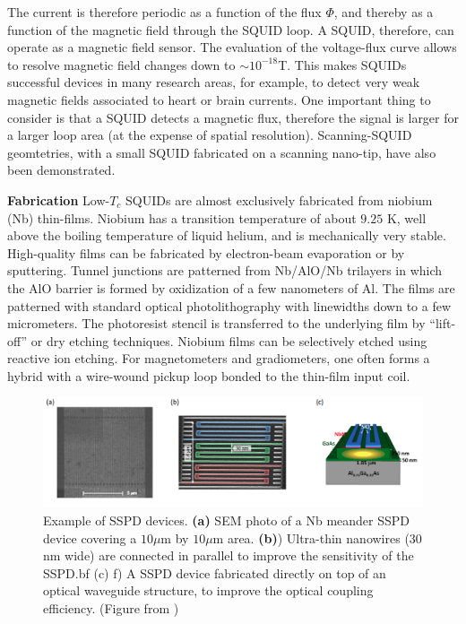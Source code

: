 \documentclass[a4paper,11pt]{article}
\begin{document}
The current is therefore periodic as a function of the flux $\Phi$, and thereby as a function of the magnetic field through the SQUID loop. A SQUID, therefore, can operate as a magnetic field sensor. The evaluation of the voltage-flux curve allows to resolve magnetic field changes down to $\sim 10^{-18}$T. This makes SQUIDs successful devices in many research areas, for example, to detect very weak magnetic fields associated to heart or brain currents. One important thing to consider is that a SQUID detects a magnetic flux, therefore the signal is larger for a larger loop area (at the expense of spatial resolution). Scanning-SQUID geomtetries, with a small SQUID fabricated on a scanning nano-tip, have also been demonstrated.

{\bf Fabrication} Low-$T_c$ SQUIDs are almost exclusively fabricated from niobium (Nb) thin-films. Niobium has a transition temperature of about $9.25$ K, well above the boiling temperature of liquid helium, and is mechanically very stable. High-quality films can  be  fabricated  by  electron-beam  evaporation  or  by  sputtering.  Tunnel  junctions are  patterned  from Nb/AlO/Nb trilayers in which the AlO barrier is formed by oxidization of a few nanometers of Al. The films are patterned with standard optical photolithography with linewidths down to a few micrometers. The photoresist stencil is transferred to the underlying film by “lift-off” or dry etching techniques. Niobium films can be selectively etched using reactive ion etching. For magnetometers and gradiometers, one often forms a hybrid with a wire-wound pickup loop bonded to the thin-film input coil.

\begin{figure}[h]
\centering
\includegraphics[width = 1\textwidth]{figures/SSPD_devices.png}
\caption{Example of SSPD devices. {\bf(a)} SEM photo of a Nb meander SSPD device covering a $10 \mu$m by $10 \mu$m area. {\bf(b)}) Ultra-thin nanowires (30 nm wide) are connected in parallel to improve the sensitivity of the SSPD.{bf (c)} f) A SSPD device fabricated directly on top of an optical waveguide structure, to improve the optical coupling efficiency. (Figure from \cite{natarajan_superconducting_2012})}
\label{fig:SSPD_device}
\end{figure}
\end{document}
